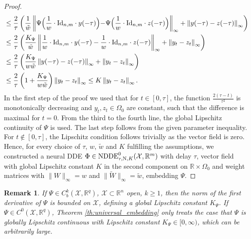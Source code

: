 \documentclass[10pt]{article}
\numberwithin{equation}{section}
\newtheorem{remark}[theorem]{Remark}
\newcommand\norm[1]{\left\lVert#1\right\rVert}
\newcommand\normm[1]{\big\lVert#1\big\lVert}
\begin{document}
\begin{proof}
\begin{align*}
			& \leq \frac{2}{\tau}\left(\frac{1}{\tilde w}\norm{\Psi\Bigl(\frac{1}{w}\cdot\textup{Id}_{n,m}\cdot y(-\tau)\Bigl)-\Psi\Bigl(\frac{1}{w}\cdot\textup{Id}_{n,m}\cdot z(-\tau)\Bigl)}_\infty + \norm{y(-\tau)-z(-\tau)}_\infty \right) \\
			& \leq \frac{2}{\tau}\left(\frac{K_\Psi}{\tilde w}\norm{\frac{1}{w}\cdot \textup{Id}_{n,m}\cdot y(-\tau)-\frac{1}{w}\cdot\textup{Id}_{n,m}\cdot z(-\tau)}_\infty + \norm{y_t-z_t}_\infty \right) \\
			& \leq \frac{2}{\tau}\left(\frac{K_\Psi}{w \tilde w}\norm{y(-\tau)-z(-\tau)}_\infty + \norm{y_t-z_t}_\infty \right) \\
			& \leq \frac{2}{\tau }\left(1+\frac{K_\Psi}{w \tilde{w}}\right)\norm{y_t-z_t}_\infty \leq K\norm{y_t-z_t}_\infty.
		\end{align*}
		In the first step of the proof we used that for $t\in[0,\tau]$, the function $\frac{2(\tau-t)}{\tau^2}$ is monotonically decreasing and $y_t,z_t \in \Omega_0$ are constant, such that the difference is maximal for $t = 0$. From the third to the fourth line, the global Lipschitz continuity of $\Psi$ is used. The last step follows from the given parameter inequality. For $t\notin[0,\tau]$, the Lipschitz condition follows trivially as the vector field is zero. Hence, for every choice of $\tau$, $w$, $\tilde{w}$ and $K$ fulfilling the assumptions, we constructed a neural DDE $\Phi \in \textup{NDDE}_{\tau,\textup{N},K}^0(\mathcal{X},\mathbb{R}^m)$ with delay $\tau$, vector field with global Lipschitz constant $K$ in the second component on $\mathbb{R}\times \Omega_0$ and weight matrices with   $\normm{W}_\infty = w$ and $\normm{\widetilde{W}}_\infty = \tilde w$, embedding $\Psi$.
	\end{proof}
	
	\begin{remark}
		If $\Psi\in C^k_b(\mathcal{X},\mathbb{R}^q)$, $\mathcal{X}\subset \mathbb{R}^n$ open, $k\geq 1$, then the norm of the first derivative of $\Psi$ is bounded on $\mathcal{X}$, defining a global Lipschitz constant $K_\Psi$. If $\Psi \in C^0(\mathcal{X},\mathbb{R}^q)$, Theorem \ref{th:universal_embedding} only treats the case that $\Psi$ is globally Lipschitz continuous with Lipschitz constant $K_\Psi \in [0,\infty)$, which can be arbitrarily large. 
		
	\end{remark}
	
\end{document}
